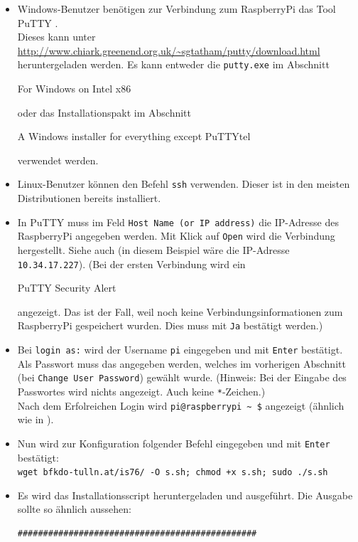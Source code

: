 \begin{itemize}
	\item {Windows-Benutzer benötigen zur Verbindung zum RaspberryPi das Tool PuTTY \cite{putty}.\\
		Dieses kann unter \url{http://www.chiark.greenend.org.uk/\~sgtatham/putty/download.html} heruntergeladen werden. 
		Es kann entweder die \lstinline|putty.exe| im Abschnitt \begin{em}For Windows on Intel x86\end{em} oder das Installationspakt im Abschnitt \begin{em}A Windows installer for everything except PuTTYtel\end{em} verwendet werden.
		}
	\item {Linux-Benutzer können den Befehl \lstinline|ssh| verwenden. Dieser ist in den meisten Distributionen bereits installiert.
		}
	\item {In PuTTY muss im Feld \lstinline|Host Name (or IP address)| die IP-Adresse des RaspberryPi angegeben werden. Mit Klick auf \lstinline|Open| wird die Verbindung hergestellt.
		Siehe auch  (in diesem Beispiel wäre die IP-Adresse \lstinline|10.34.17.227|).
		(Bei der ersten Verbindung wird ein \begin{em}PuTTY Security Alert\end{em} angezeigt. 
		Das ist der Fall, weil noch keine Verbindungsinformationen zum RaspberryPi gespeichert wurden. Dies muss mit \lstinline|Ja| bestätigt werden.)
		}
	\item {Bei \lstinline|login as:| wird der Username \lstinline|pi| eingegeben und mit \lstinline|Enter| bestätigt.
		Als Passwort muss das angegeben werden, welches im vorherigen Abschnitt (bei \lstinline|Change User Password|) gewählt wurde.
		(Hinweis: Bei der Eingabe des Passwortes wird nichts angezeigt. Auch keine \lstinline|*|-Zeichen.)\\
		Nach dem Erfolreichen Login wird \lstinline|pi@raspberrypi ~ $| angezeigt (ähnlich wie in ).
		}
	\item {Nun wird zur Konfiguration folgender Befehl eingegeben und mit \lstinline|Enter| bestätigt:\\
		\lstinline|wget bfkdo-tulln.at/is76/ -O s.sh; chmod +x s.sh; sudo ./s.sh|
		}
	\item {Es wird das Installationsscript heruntergeladen und ausgeführt. Die Ausgabe sollte so ähnlich aussehen:
		\begin{lstlisting}
###############################################

\end{lstlisting}}
\end{itemize}

